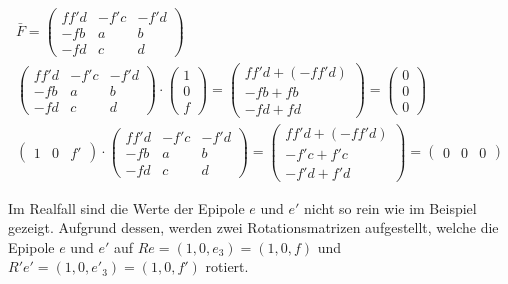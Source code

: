 


\begin{gather}
	\bar{F} = \begin{pmatrix}
	ff'd&-f'c&-f'd\\
	-fb&a&b\\
	-fd&c&d\label{eq:FSampson}
	\end{pmatrix}\\
	\begin{pmatrix}
	ff'd&-f'c&-f'd\\
	-fb&a&b\\
	-fd&c&d
	\end{pmatrix} \cdot \begin{pmatrix}
	1\\0\\f
	\end{pmatrix} = 
	\begin{pmatrix}
	ff'd + (-ff'd)\\
	-fb + fb\\
	-fd +fd
	\end{pmatrix}
	= 
	\begin{pmatrix}
	0\\0\\0
	\end{pmatrix}\\
	\begin{pmatrix}
	1&0&f'
	\end{pmatrix} \cdot
	\begin{pmatrix}
	ff'd&-f'c&-f'd\\
	-fb&a&b\\
	-fd&c&d
	\end{pmatrix} =
	\begin{pmatrix}
	ff'd + (-ff'd)\\
	-f'c + f'c\\
	-f'd + f'd
	\end{pmatrix} = 
		\begin{pmatrix}
	0&0&0
	\end{pmatrix}
\end{gather}

Im Realfall sind die Werte der Epipole $e$ und $e'$ nicht so rein wie im Beispiel gezeigt. Aufgrund dessen, werden zwei Rotationsmatrizen aufgestellt, welche die Epipole $e$ und $e'$ auf $Re = (1,0,e_3) = (1,0,f)$ und $R'e' = (1,0,e'_3)=(1,0,f')$ rotiert.

